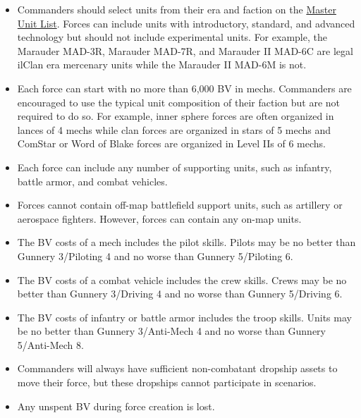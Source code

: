 \documentclass[UTF8]{article}
\begin{document}
\begin{itemize}

\item Commanders should select units from their era and faction on the \href{http://www.masterunitlist.info/}{Master Unit List}.
Forces can include units with introductory, standard, and advanced technology but should not include experimental units.
For example, the Marauder MAD-3R, Marauder MAD-7R, and Marauder II MAD-6C are legal ilClan era mercenary units while the Marauder II MAD-6M is not.

\item Each force can start with no more than 6,000 BV in mechs.
Commanders are encouraged to use the typical unit composition of their faction but are not required to do so.
For example, inner sphere forces are often organized in lances of 4 mechs while clan forces are organized in stars of 5 mechs and ComStar or Word of Blake forces are organized in Level IIs of 6 mechs.

\item Each force can include any number of supporting units, such as infantry, battle armor, and combat vehicles.

\item Forces cannot contain off-map battlefield support units, such as artillery or aerospace fighters.
However, forces can contain any on-map units.

\item The BV costs of a mech includes the pilot skills.
Pilots may be no better than Gunnery 3/Piloting 4 and no worse than Gunnery 5/Piloting 6.

\item The BV costs of a combat vehicle includes the crew skills.
Crews may be no better than Gunnery 3/Driving 4 and no worse than Gunnery 5/Driving 6.

\item The BV costs of infantry or battle armor includes the troop skills.
Units may be no better than Gunnery 3/Anti-Mech 4 and no worse than Gunnery 5/Anti-Mech 8.

\item Commanders will always have sufficient non-combatant dropship assets to move their force, but these dropships cannot participate in scenarios.

\item Any unspent BV during force creation is lost.

\end{itemize}
\end{document}
